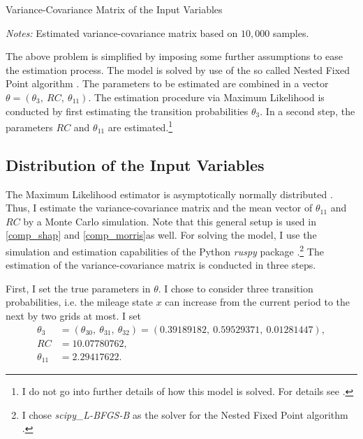 \begin{table}
	\centering
	\caption{Variance-Covariance Matrix of the Input Variables}
	\label{cov}
	\begin{threeparttable}
	\centering
	
	\begin{tablenotes}
	\small
	\item \textit{Notes:} Estimated variance-covariance matrix based on $10,000$ samples.
	\end{tablenotes}
	\end{threeparttable}
\end{table}

The above problem is simplified by imposing some further assumptions to ease the estimation process. The model is solved by use of the so called Nested Fixed Point algorithm \citep{R87}. The parameters to be estimated are combined in a vector $\theta=(\theta_3,\ RC,\ \theta_{11}) $. The estimation procedure via Maximum Likelihood is conducted by first estimating the transition probabilities $\theta_3$. In a second step, the parameters $RC$ and $\theta_{11}$ are estimated.\footnote{I do not go into further details of how this model is solved. For details see \citet{R87}.}

\subsection{Distribution of the Input Variables} \label{model_setup}

The Maximum Likelihood estimator is asymptotically normally distributed \citep{R73}. Thus, I estimate the variance-covariance matrix and the mean vector of $\theta_{11}$ and $RC$ by a Monte Carlo simulation. Note that this general setup is used in \cref{comp_shap} and \cref{comp_morris}as well. For solving the model, I use the simulation and estimation capabilities of the Python \textit{ruspy} package \citep{OSE19}.\footnote{I chose \textit{scipy\_L-BFGS-B} as the solver for the Nested Fixed Point algorithm \citep{SP20}.} The estimation of the variance-covariance matrix is conducted in three steps.

First, I set the true parameters in $\theta$. I chose to consider three transition probabilities, i.e. the mileage state $x$ can increase from the current period to the next by two grids at most. I set
\begin{align*}
\theta_3 &= (\theta_{30},\ \theta_{31},\ \theta_{32})=(0.39189182,\ 0.59529371,\ 0.01281447),\\
RC &= 10.07780762,\\
\theta_{11} &= 2.29417622.
\end{align*}

